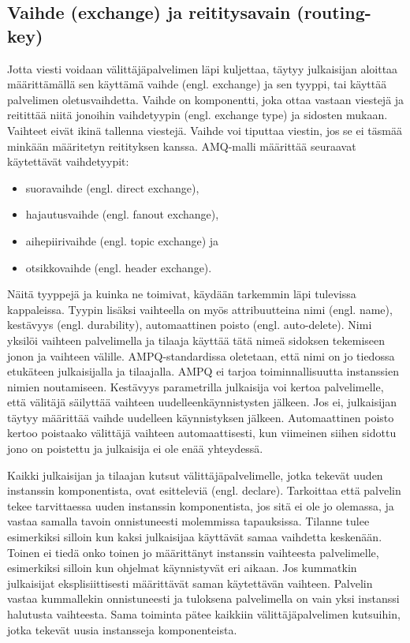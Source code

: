 \subsection{Vaihde (exchange) ja reititysavain (routing-key)}
Jotta viesti voidaan välittäjäpalvelimen läpi kuljettaa, täytyy julkaisijan aloittaa määrittämällä sen käyttämä vaihde (engl. exchange) ja sen tyyppi, tai käyttää palvelimen oletusvaihdetta. Vaihde on komponentti, joka ottaa vastaan viestejä ja reitittää niitä jonoihin vaihdetyypin (engl. exchange type) ja sidosten mukaan. Vaihteet eivät ikinä tallenna viestejä. Vaihde voi tiputtaa viestin, jos se ei täsmää minkään määritetyn reitityksen kanssa. AMQ-malli määrittää seuraavat käytettävät vaihdetyypit:
\begin{itemize}
	\item suoravaihde (engl. direct exchange),
	\item hajautusvaihde (engl. fanout exchange),
	\item aihepiirivaihde (engl. topic exchange) ja
	\item otsikkovaihde (engl. header exchange).
\end{itemize}

Näitä tyyppejä ja kuinka ne toimivat, käydään tarkemmin läpi tulevissa kappaleissa. Tyypin lisäksi vaihteella on myös attribuutteina nimi (engl. name), kestävyys (engl. durability), automaattinen poisto (engl. auto-delete). Nimi yksilöi vaihteen palvelimella ja tilaaja käyttää tätä nimeä sidoksen tekemiseen jonon ja vaihteen välille. AMPQ-standardissa oletetaan, että nimi on jo tiedossa etukäteen julkaisijalla ja tilaajalla. AMPQ ei tarjoa toiminnallisuutta instanssien nimien noutamiseen. Kestävyys parametrilla julkaisija voi kertoa palvelimelle, että välitäjä säilyttää vaihteen uudelleenkäynnistysten jälkeen. Jos ei, julkaisijan täytyy määrittää vaihde uudelleen käynnistyksen jälkeen. Automaattinen poisto kertoo poistaako välittäjä vaihteen automaattisesti, kun viimeinen siihen sidottu jono on poistettu ja julkaisija ei ole enää yhteydessä.

Kaikki julkaisijan ja tilaajan kutsut välittäjäpalvelimelle, jotka tekevät uuden instanssin komponentista, ovat esitteleviä (engl. declare). Tarkoittaa että palvelin tekee tarvittaessa uuden instanssin komponentista, jos sitä ei ole jo olemassa, ja vastaa samalla tavoin onnistuneesti molemmissa tapauksissa. Tilanne tulee esimerkiksi silloin kun kaksi julkaisijaa käyttävät samaa vaihdetta keskenään. Toinen ei tiedä onko toinen jo määrittänyt instanssin vaihteesta palvelimelle, esimerkiksi silloin kun ohjelmat käynnistyvät eri aikaan. Jos kummatkin julkaisijat eksplisiittisesti määrittävät saman käytettävän vaihteen. Palvelin vastaa kummallekin onnistuneesti ja tuloksena palvelimella on vain yksi instanssi halutusta vaihteesta. Sama toiminta pätee kaikkiin välittäjäpalvelimen kutsuihin, jotka tekevät uusia instansseja komponenteista.

